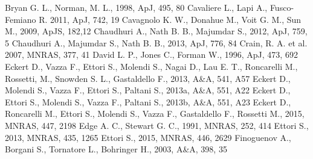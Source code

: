 \documentclass[a4paper,fleqn,usenatbib]{mnras}
\begin{document}
{\begin{thebibliography}{}
 Bryan G. L., Norman, M. L., 1998, ApJ, 495, 80
Cavaliere L., Lapi A.,  Fusco-Femiano R. 2011, ApJ, 742, 19
Cavagnolo K. W., Donahue M., Voit G. M., Sun M., 2009, ApJS, 182,12
Chaudhuri A., Nath B. B., Majumdar S., 2012, ApJ, 759, 5 
Chaudhuri A., Majumdar S., Nath B. B., 2013, ApJ, 776, 84
Crain, R. A. et al. 2007, MNRAS, 377, 41
David L. P., Jones C., Forman W., 1996, ApJ, 473, 692 
Eckert D., Vazza F., Ettori S., Molendi S., Nagai D., Lau E. T., Roncarelli M., Rossetti, M., Snowden S. L., Gastaldello F., 2013, A\&A, 541, A57
 Eckert D., Molendi S., Vazza F., Ettori S., Paltani S., 2013a, A\&A, 551, A22
Eckert D., Ettori S., Molendi S., Vazza F., Paltani S., 2013b, A\&A, 551, A23
Eckert D., Roncarelli M., Ettori S., Molendi S., Vazza F., Gastaldello F., Rossetti M., 2015, MNRAS, 447, 2198
Edge A. C., Stewart G. C., 1991, MNRAS, 252, 414
Ettori S., 2013, MNRAS, 435, 1265
Ettori S., 2015, MNRAS, 446, 2629
Finoguenov A., Borgani S., Tornatore L., Bohringer H., 2003, A\&A, 398, 35

\end{thebibliography}}
\end{document}
